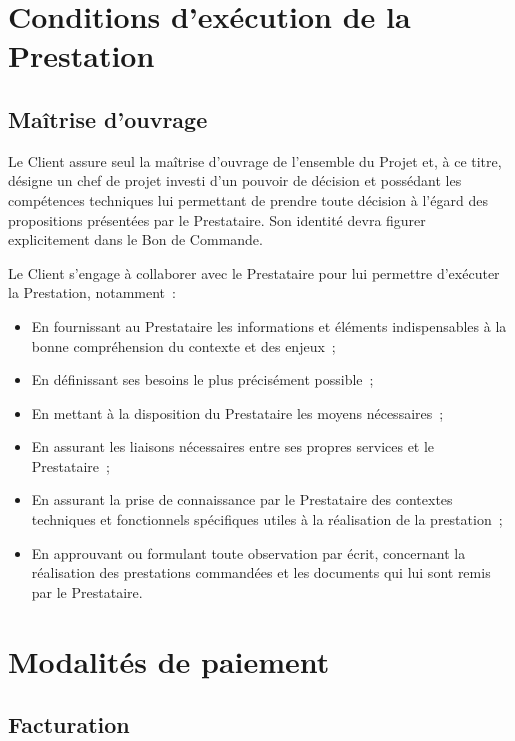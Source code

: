 \documentclass[8pt,french]{base}
\begin{document}
\begin{multicols*}{3}
\section{Conditions d’exécution de la Prestation}

\subsection{Maîtrise d’ouvrage}

Le Client assure seul la maîtrise d’ouvrage de l’ensemble du Projet et, à ce titre, désigne un chef de projet investi d’un pouvoir de décision et possédant les compétences techniques lui permettant de prendre toute décision à l’égard des propositions présentées par le Prestataire. Son identité devra figurer explicitement dans le Bon de Commande.

Le Client s’engage à collaborer avec le Prestataire pour lui permettre d’exécuter la Prestation, notamment~:
\begin{itemize}
  \item En fournissant au Prestataire les informations et éléments indispensables à la bonne compréhension du contexte et des enjeux~;
  \item En définissant ses besoins le plus précisément possible~;
  \item En mettant à la disposition du Prestataire les moyens nécessaires~;
  \item En assurant les liaisons nécessaires entre ses propres services et le Prestataire~;
  \item En assurant la prise de connaissance par le Prestataire des contextes techniques et fonctionnels spécifiques utiles à la réalisation de la prestation~;
  \item En approuvant ou formulant toute observation par écrit, concernant la réalisation des prestations commandées et les documents qui lui sont remis par le Prestataire.
\end{itemize}


\section{Modalités de paiement}

\subsection{Facturation}


\end{multicols*}
\end{document}
